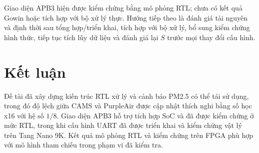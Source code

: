 \documentclass[a4paper,oneside,openany]{extreport}
\begin{document}
Giao diện APB3 hiện được kiểm chứng bằng mô phỏng RTL; chưa có kết quả Gowin hoặc tích hợp với bộ xử lý thực. Hướng tiếp theo là đánh giá tài nguyên và định thời sau tổng hợp/triển khai, tích hợp với bộ xử lý, bổ sung kiểm chứng hình thức, tiếp tục tích lũy dữ liệu và đánh giá lại $S$ trước mọi thay đổi cấu hình.

\section{Kết luận}
Đề tài đã xây dựng kiến trúc RTL xử lý và cảnh báo PM2.5 có thể tái sử dụng, trong đó độ lệch giữa CAMS và PurpleAir được cập nhật thích nghi bằng số học x16 với hệ số $1/8$. Giao diện APB3 hỗ trợ tích hợp SoC và đã được kiểm chứng ở mức RTL, trong khi cấu hình UART đã được triển khai và kiểm chứng vật lý trên Tang Nano 9K. Kết quả mô phỏng RTL và kiểm chứng trên FPGA phù hợp với mô hình tham chiếu trong phạm vi đã kiểm tra.
\end{document}
